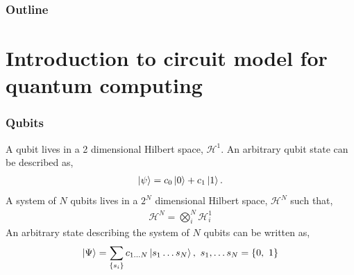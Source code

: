 \documentclass{beamer}
\newcommand{\mc}{\mathcal}
\renewcommand{\(}{\left(}
\renewcommand{\)}{\right)}
\renewcommand{\[}{\left[}
\renewcommand{\]}{\right]}
\begin{document}
\begin{frame}
    \frametitle{Outline}

    \tableofcontents

\end{frame}
\section{Introduction to circuit model for quantum computing}

\begin{frame}
    \frametitle{Qubits}
    A qubit lives in a 2 dimensional Hilbert space, $\mc H^1$. An arbitrary qubit state can be described as, 
    \begin{align*}
        \ket{\psi} = c_0 \ket{0} + c_1 \ket{1}.
    \end{align*}
    \pause
    A system of $N$ qubits lives in a $2^N$ dimensional Hilbert space, $\mc H^N$ such that, 
    \begin{align*}
        \mc H^N = \bigotimes_i^N \mc H^1_i
    \end{align*}
    An arbitrary state describing the system of $N$ qubits can be written as, 
    \begin{align*}
        \ket{\Psi} = \sum_{\{s_i\}} c_{1 \dots N} \ket{s_1 \dots s_N}, \ s_1, \dots s_N = \{0, \ 1\}
    \end{align*}

\end{frame}
\end{document}
